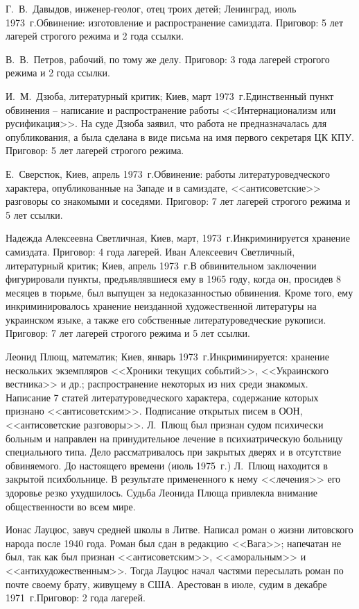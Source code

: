 \documentclass{book}
\begin{document}
Г.~В.~Давыдов, инженер-геолог, отец троих детей; Ленинград, июль 1973~г.Обвинение: изготовление и распространение самиздата. 
Приговор: 5 лет лагерей строгого режима и 2 года ссылки.

В.~В.~Петров, рабочий, по тому же делу. Приговор: 3 года лагерей строгого режима и 2 года ссылки.

И.~М.~Дзюба, литературный критик; Киев, март 1973~г.Единственный пункт обвинения -- написание и распространение ра­боты 
<<Интернационализм или русификация>>. На суде Дзюба заявил, что работа не предназначалась для опубликования, а была сделана в виде 
письма на имя первого секретаря ЦК КПУ. Приговор: 5 лет лагерей строгого режима.

Е.~Сверстюк, Киев, апрель 1973~г.Обвинение: работы литературоведческого характера, опубликованные на Западе и в самиздате, 
<<антисоветские>> разговоры со знакомыми и сосе­дями. Приговор: 7 лет лагерей строгого режима и 5 лет ссылки.

Надежда Алексеевна Светличная, Киев, март, 1973~г.Инкриминируется хранение самиздата. Приговор: 4 года лагерей.
Иван Алексеевич Светличный, литературный критик; Киев, апрель 1973~г.В обвинительном заключении фигурировали пункты, 
предъявлявшиеся ему в 1965 году, когда он, просидев 8 месяцев в тюрьме, был выпущен за недоказанностью обвинения. Кроме того, 
ему инкриминировалось хранение неизданной художественной литературы на украинском языке, а также его собственные 
литературоведческие рукописи. Приговор: 7 лет лагерей строгого режима и 5 лет ссылки.

Леонид Плющ, математик; Киев, январь 1973~г.Инкриминируется: хранение нескольких экземпляров <<Хроники текущих событий>>, <<Украинского вестника>> и др.; распространение некоторых из них среди знакомых. Написание 7 статей литературоведческого характера, содержание которых признано <<антисоветским>>. Подписание открытых писем в ООН, <<антисоветские разговоры>>. Л.~Плющ был признан судом психически больным и направлен на принудительное лечение в психиатрическую больницу специального типа. Дело рассматривалось при закрытых дверях и в отсутствие обвиняемого. До настоящего времени (июль 1975~г.) Л.~Плющ находится в закрытой психбольнице. В результате примененного к нему <<лечения>> его здоровье резко ухудшилось. Судьба Леонида Плюща привлекла внимание общественности во всем мире.

Ионас Лауцюс, завуч средней школы в Литве. Написал роман о жизни литовского народа после 1940 года. Роман был сдан в редакцию <<Вага>>; напечатан не был, так как был признан <<антисоветским>>, <<аморальным>> и <<антихудожественным>>. Тогда Лауцюс начал частями пересылать роман по почте своему брату, живущему в США. Арестован в июле, судим в декабре 1971~г.Приговор: 2 года лагерей.
\end{document}
